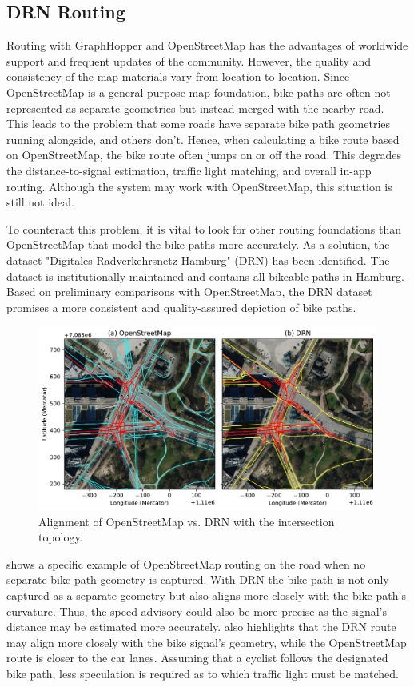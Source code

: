 \subsection{DRN Routing}

Routing with GraphHopper and OpenStreetMap has the advantages of worldwide support and frequent updates of the community. However, the quality and consistency of the map materials vary from location to location. Since OpenStreetMap is a general-purpose map foundation, bike paths are often not represented as separate geometries but instead merged with the nearby road. This leads to the problem that some roads have separate bike path geometries running alongside, and others don't. Hence, when calculating a bike route based on OpenStreetMap, the bike route often jumps on or off the road. This degrades the distance-to-signal estimation, traffic light matching, and overall in-app routing. Although the system may work with OpenStreetMap, this situation is still not ideal.

To counteract this problem, it is vital to look for other routing foundations than OpenStreetMap that model the bike paths more accurately. As a solution, the dataset "Digitales Radverkehrsnetz Hamburg" (DRN) has been identified. The dataset is institutionally maintained and contains all bikeable paths in Hamburg. Based on preliminary comparisons with OpenStreetMap, the DRN dataset promises a more consistent and quality-assured depiction of bike paths.

\begin{figure}[htbp]
\centering
\includegraphics[width=\linewidth]{images/routing-drn-osm-intersection.pdf}
\caption{Alignment of OpenStreetMap vs. DRN with the intersection topology.}
\label{fig:comparison}
\end{figure}

 shows a specific example of OpenStreetMap routing on the road when no separate bike path geometry is captured. With DRN the bike path is not only captured as a separate geometry but also aligns more closely with the bike path's curvature. Thus, the speed advisory could also be more precise as the signal's distance may be estimated more accurately.  also highlights that the DRN route may align more closely with the bike signal's geometry, while the OpenStreetMap route is closer to the car lanes. Assuming that a cyclist follows the designated bike path, less speculation is required as to which traffic light must be matched. 

